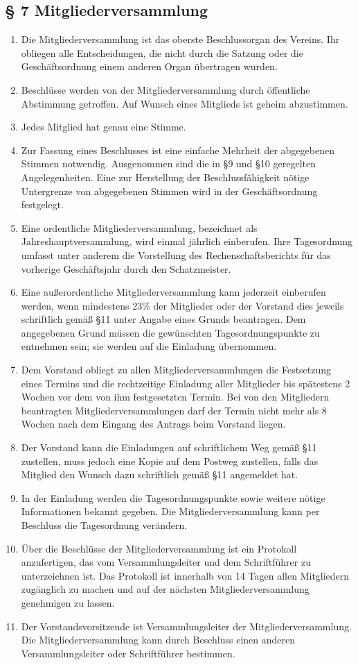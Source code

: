\documentclass[10pt,a4paper]{scrartcl}
\begin{document}
\subsection*{§ 7 Mitgliederversammlung}
\begin{enumerate}
	\item Die Mitgliederversammlung ist das oberste Beschlussorgan des Vereins. Ihr obliegen
		alle Entscheidungen, die nicht durch die Satzung oder die Geschäftsordnung einem
		anderen Organ übertragen wurden.
	\item Beschlüsse werden von der Mitgliederversammlung durch öffentliche Abstimmung getroffen.
		Auf Wunsch eines Mitglieds ist geheim abzustimmen.
	\item Jedes Mitglied hat genau eine Stimme.
	\item Zur Fassung eines Beschlusses ist eine einfache Mehrheit der abgegebenen Stimmen
		notwendig. Ausgenommen sind die in §9 und §10 geregelten Angelegenheiten. Eine
		zur Herstellung der Beschlussfähigkeit nötige Untergrenze von abgegebenen Stimmen
		wird in der Geschäftsordnung festgelegt.
	\item Eine ordentliche Mitgliederversammlung, bezeichnet als Jahreshauptversammlung,
		wird einmal jährlich einberufen. Ihre Tagesordnung umfasst unter anderem die
		Vorstellung des Rechenschaftsberichts für das vorherige Geschäftsjahr durch
		den Schatzmeister.
	\item Eine außerordentliche Mitgliederversammlung kann jederzeit einberufen werden, wenn
		mindestens 23\% der Mitglieder oder der Vorstand dies jeweils schriftlich gemäß §11
		unter Angabe eines Grunds beantragen. Dem angegebenen Grund müssen die gewünschten
		Tagesordnungspunkte zu entnehmen sein; sie werden auf die Einladung übernommen.
	\item Dem Vorstand obliegt zu allen Mitgliederversammlungen die Festsetzung eines Termins
		und die rechtzeitige Einladung aller Mitglieder bis spätestens 2 Wochen vor dem
		von ihm festgesetzten Termin. Bei von den Mitgliedern beantragten
		Mitgliederversammlungen darf der Termin nicht mehr als 8 Wochen nach dem Eingang
		des Antrags beim Vorstand liegen.
	\item Der Vorstand kann die Einladungen auf schriftlichem Weg gemäß §11 zustellen, muss
		jedoch eine Kopie auf dem Postweg zustellen, falls das Mitglied den Wunsch dazu
		schriftlich gemäß §11 angemeldet hat.
	\item In der Einladung werden die Tagesordnungspunkte sowie weitere nötige Informationen
		bekannt gegeben. Die Mitgliederversammlung kann per Beschluss die Tagesordnung
		ver\-ändern.
	\item Über die Beschlüsse der Mitgliederversammlung ist ein Protokoll anzufertigen,
		das vom Versammlungsleiter und dem Schriftführer zu unterzeichnen ist.
		Das Protokoll ist innerhalb von 14 Tagen allen Mitgliedern zugänglich zu
		machen und auf der nächsten Mitgliederversammlung genehmigen zu lassen.
	\item Der Vorstandsvorsitzende ist Versammlungsleiter der Mitgliederversammlung.
		Die Mitgliederversammlung kann durch Beschluss einen anderen Versammlungsleiter
		oder Schrift\-füh\-rer bestimmen.
\end{enumerate}
\end{document}
